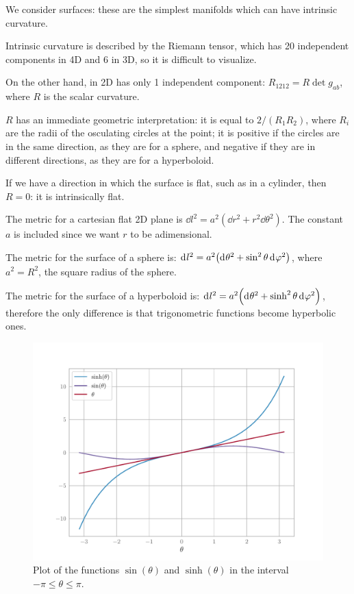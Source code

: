 \documentclass[main.tex]{subfiles}
\begin{document}
We consider surfaces: these are the simplest manifolds which can have intrinsic curvature.

\begin{bluebox}
Intrinsic curvature is described by the Riemann tensor, which has 20 independent components in 4D and 6 in 3D, so it is difficult to visualize.

On the other hand, in 2D has only 1 independent component: \(R_{1212} = R \det g_{ab}\), where \(R\) is the scalar curvature. 

\(R\) has an immediate geometric interpretation: it is equal to \(2/(R_1 R_2)\), where \(R_i\) are the radii of the osculating circles at the point; it is positive if the circles are in the same direction, as they are for a sphere, and negative if they are in different directions, as they are for a hyperboloid.

If we have a direction in which the surface is flat, such as in a cylinder, then \(R=0\): it is intrinsically flat.
\end{bluebox}

The metric for a cartesian flat 2D plane is \(\dd{l^2} = a^2 (\dd{r^2} + r^2 \dd{\theta^2}) \).
The constant \(a\) is included since we want \(r\) to be adimensional.

The metric for the surface of a sphere is:
\(\dd[]{l^2} = a^2 \qty(\dd[]{\theta^2} + \sin^2 \theta \dd[]{\varphi^2}) \),
where \(a^2 = R^2\), the square radius of the sphere.

The metric for the surface of a hyperboloid is:
\(\dd[]{l^2} = a^2 \qty(\dd[]{\theta^2} + \sinh^2 \theta \dd[]{\varphi^2}) \),
therefore the only difference is that trigonometric functions become hyperbolic ones.

\begin{figure}[ht]
\centering
\includegraphics[width=\textwidth]{figures/sin_vs_sinh.pdf}
\caption{Plot of the functions \(\sin(\theta )\) and \(\sinh (\theta )\) in the interval \(-\pi \leq \theta\leq \pi  \).}
\label{fig:sin_vs_sinh}
\end{figure}
\end{document}
